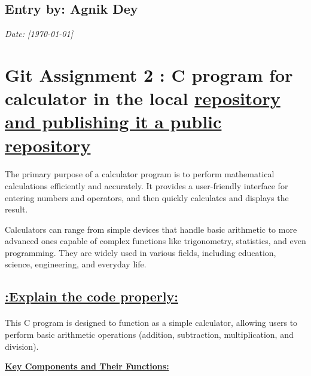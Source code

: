 \documentclass[a4paper,12pt]{article}
\begin{document}
\subsection*{Entry by: Agnik Dey}
\textit{Date: [\today]}\\
\section*{\large{Git Assignment 2 : C program for calculator in the local
{\underline{repository and publishing it a public repository}}}}
\paragraph{}
The primary purpose of a calculator program is to perform mathematical calculations efficiently and accurately. It provides a user-friendly interface for entering numbers and operators, and then quickly calculates and displays the result. 

Calculators can range from simple devices that handle basic arithmetic to more advanced ones capable of complex functions like trigonometry, statistics, and even programming. They are widely used in various fields, including education, science, engineering, and everyday life.
\begin{center}
\section*{\underline{{:Explain the code properly:}}}
\end{center}

\paragraph{}
This C program is designed to function as a simple calculator, allowing users to perform basic arithmetic operations (addition, subtraction, multiplication, and division).\\

\begin{flushleft}
\underline{\textbf{Key Components and Their Functions:}}\\
\end{flushleft}
\end{document}
